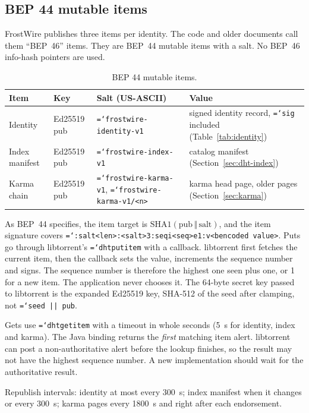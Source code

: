 \documentclass[11pt,a4paper]{article}
\newcommand{\code}[1]{\texttt{\hyphenchar\font=`\-\relax #1}}
\DeclareRobustCommand{\_}{\origunderscore\allowbreak}
\begin{document}
\subsection{BEP 44 mutable items}
FrostWire publishes three items per identity. The code and older documents call them
``BEP~46'' items. They are BEP~44 mutable items with a salt. No BEP~46 info-hash pointers are
used.

\begin{table}[ht]
\centering\small
\begin{tabularx}{\textwidth}{lllL}
\toprule
Item & Key & Salt (US-ASCII) & Value\\
\midrule
Identity & Ed25519 pub & \code{frostwire-identity-v1} & signed identity record, \code{sig} included (Table~\ref{tab:identity})\\
Index manifest & Ed25519 pub & \code{frostwire-index-v1} & catalog manifest (Section~\ref{sec:dht-index})\\
Karma chain & Ed25519 pub & \code{frostwire-karma-v1}, \code{frostwire-karma-v1/<n>} & karma head page, older pages (Section~\ref{sec:karma})\\
\bottomrule
\end{tabularx}
\caption{BEP 44 mutable items.}
\label{tab:bep44}
\end{table}

As BEP~44 specifies, the item target is $\mathrm{SHA1}(\mathrm{pub} \,\Vert\, \mathrm{salt})$,
and the item signature covers \code{4:salt<len>:<salt>3:seqi<seq>e1:v<bencoded value>}.
Puts go through libtorrent's \code{dht\_put\_item} with a callback. libtorrent first fetches
the current item, then the callback sets the value, increments the sequence number and
signs. The sequence number is therefore the highest one seen plus one, or 1 for a new item.
The application never chooses it. The 64-byte secret key passed to libtorrent is the expanded
Ed25519 key, SHA-512 of the seed after clamping, not \code{seed || pub}.

Gets use \code{dht\_get\_item} with a timeout in whole seconds (5~s for identity, index and
karma). The Java binding returns the \emph{first} matching item alert. libtorrent can post a
non-authoritative alert before the lookup finishes, so the result may not have the highest
sequence number. A new implementation should wait for the authoritative result.

Republish intervals: identity at most every 300~s; index manifest when it changes or every
300~s; karma pages every 1800~s and right after each endorsement.
\end{document}
